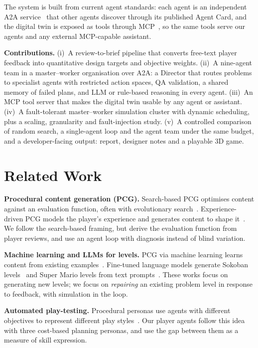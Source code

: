 \documentclass[conference]{IEEEtran}
\begin{document}
The system is built from current agent standards: each agent is an independent A2A
service~\cite{a2aspec} that other agents discover through its published Agent Card, and the digital
twin is exposed as tools through MCP~\cite{mcpspec}, so the same tools serve our agents and any
external MCP-capable assistant.

\textbf{Contributions.}
(i)~A review-to-brief pipeline that converts free-text player feedback into quantitative design
targets and objective weights.
(ii)~A nine-agent team in a master--worker organisation over A2A: a Director that routes problems
to specialist agents with restricted action spaces, QA validation, a shared memory of failed plans,
and LLM or rule-based reasoning in every agent.
(iii)~An MCP tool server that makes the digital twin usable by any agent or assistant.
(iv)~A fault-tolerant master--worker simulation cluster with dynamic scheduling, plus a scaling,
granularity and fault-injection study.
(v)~A controlled comparison of random search, a single-agent loop and the agent team under the same
budget, and a developer-facing output: report, designer notes and a playable 3D game.

\section{Related Work}
\textbf{Procedural content generation (PCG).} Search-based PCG optimises content against an
evaluation function, often with evolutionary search~\cite{togelius2011sbpcg,shaker2016pcg}.
Experience-driven PCG models the player's experience and generates content to shape
it~\cite{yannakakis2011edpcg}. We follow the search-based framing, but derive the evaluation
function from player reviews, and use an agent loop with diagnosis instead of blind variation.

\textbf{Machine learning and LLMs for levels.} PCG via machine learning learns content from
existing examples~\cite{summerville2018pcgml}. Fine-tuned language models generate Sokoban
levels~\cite{todd2023level} and Super Mario levels from text prompts~\cite{sudhakaran2023mariogpt}.
These works focus on generating new levels; we focus on \emph{repairing} an existing problem level
in response to feedback, with simulation in the loop.

\textbf{Automated play-testing.} Procedural personas use agents with different objectives to
represent different play styles~\cite{holmgard2019personas}. Our player agents follow this idea
with three cost-based planning personas, and use the gap between them as a measure of skill
expression.
\end{document}
